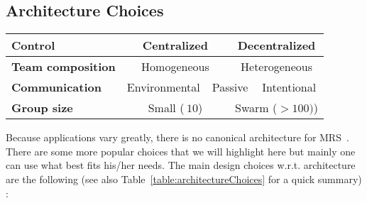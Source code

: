   \subsection{Architecture Choices}

    \begin{table*}[ht]
      \centerfloat
        \begin{tabular}{|l|c|c|c|c|c|c|}
          \hline
          \textbf{Control} & \multicolumn{3}{|c|}{Centralized} & \multicolumn{3}{|c|}{Decentralized} \\
          \hline
          \textbf{Team composition} & \multicolumn{3}{|c|}{Homogeneous} & \multicolumn{3}{|c|}{Heterogeneous} \\
          \hline
          \textbf{Communication} & \multicolumn{2}{|c|}{Environmental} & \multicolumn{2}{|c|}{Passive} & \multicolumn{2}{|c|}{Intentional} \\
          \hline
          \textbf{Group size} & \multicolumn{3}{|c|}{Small (\(~10\))} & \multicolumn{3}{|c|}{Swarm (\(> 100)\))} \\
          \hline
        \end{tabular}
        \caption{\textbf{Architecture choices in multirobot systems.}}
      \label{table:architectureChoices}
    \end{table*}

    Because applications vary greatly, there is no canonical architecture for MRS~\parencite{Cao1997, Parker2008}. There are some more popular choices that we will highlight here but mainly one can use what best fits his/her needs. The main design choices w.r.t. architecture are the following (see also Table~\ref{table:architectureChoices} for a quick summary) :

